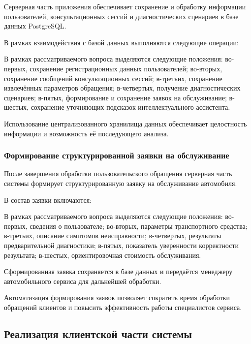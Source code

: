 \documentclass[14pt,a4paper]{extarticle}
\numberwithin{figure}{section}
\numberwithin{table}{section}
\begin{document}
Серверная часть приложения обеспечивает сохранение и обработку
информации пользователей, консультационных сессий и диагностических
сценариев в базе данных PostgreSQL.

В рамках взаимодействия с базой данных выполняются следующие операции:


В рамках рассматриваемого вопроса выделяются следующие положения: во-первых, сохранение регистрационных данных пользователей; во-вторых, сохранение сообщений консультационных сессий; в-третьих, сохранение извлечённых параметров обращения; в-четвертых, получение диагностических сценариев; в-пятых, формирование и сохранение заявок на обслуживание; в-шестых, сохранение уточняющих подсказок интеллектуального ассистента.


Использование централизованного хранилища данных обеспечивает
целостность информации и возможность её последующего анализа.

\subsubsection{Формирование структурированной заявки на обслуживание}

После завершения обработки пользовательского обращения серверная часть
системы формирует структурированную заявку на обслуживание автомобиля.

В состав заявки включаются:


В рамках рассматриваемого вопроса выделяются следующие положения: во-первых, сведения о пользователе; во-вторых, параметры транспортного средства; в-третьих, описание симптомов неисправности; в-четвертых, результаты предварительной диагностики; в-пятых, показатель уверенности корректности результата; в-шестых, ориентировочная стоимость обслуживания.


Сформированная заявка сохраняется в базе данных и передаётся менеджеру
автомобильного сервиса для дальнейшей обработки.

Автоматизация формирования заявок позволяет сократить время обработки
обращений клиентов и повысить эффективность работы специалистов сервиса.

\subsection{Реализация клиентской части
системы}\label{ux440ux435ux430ux43bux438ux437ux430ux446ux438ux44f-ux43aux43bux438ux435ux43dux442ux441ux43aux43eux439-ux447ux430ux441ux442ux438-ux441ux438ux441ux442ux435ux43cux44b}
\end{document}
